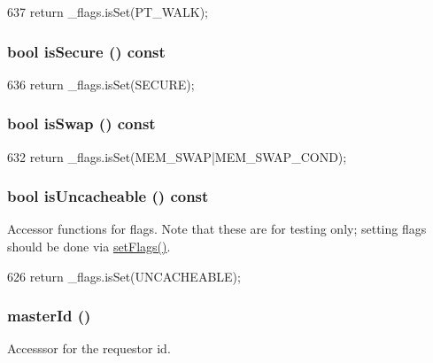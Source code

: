 \begin{DoxyCode}
637 { return _flags.isSet(PT_WALK); }
\end{DoxyCode}
\hypertarget{classRequest_a3110ebf17828782ae5aeced7396cfff2}{
\subsubsection[{isSecure}]{\setlength{\rightskip}{0pt plus 5cm}bool isSecure () const}}
\label{classRequest_a3110ebf17828782ae5aeced7396cfff2}



\begin{DoxyCode}
636 { return _flags.isSet(SECURE); }
\end{DoxyCode}
\hypertarget{classRequest_a6ec455c5a36403d3a8319bcfbf356bc1}{
\subsubsection[{isSwap}]{\setlength{\rightskip}{0pt plus 5cm}bool isSwap () const}}
\label{classRequest_a6ec455c5a36403d3a8319bcfbf356bc1}



\begin{DoxyCode}
632 { return _flags.isSet(MEM_SWAP|MEM_SWAP_COND); }
\end{DoxyCode}
\hypertarget{classRequest_a70c74b2809417ea8701dd6ba9e34312d}{
\subsubsection[{isUncacheable}]{\setlength{\rightskip}{0pt plus 5cm}bool isUncacheable () const}}
\label{classRequest_a70c74b2809417ea8701dd6ba9e34312d}
Accessor functions for flags. Note that these are for testing only; setting flags should be done via \hyperlink{classRequest_a33971d22712c9c80177e4362dffd5580}{setFlags()}. 


\begin{DoxyCode}
626 { return _flags.isSet(UNCACHEABLE); }
\end{DoxyCode}
\hypertarget{classRequest_a9b7d32db0521388c0953e531c79aab50}{
\subsubsection[{masterId}]{ masterId ()}}
\label{classRequest_a9b7d32db0521388c0953e531c79aab50}
Accesssor for the requestor id. 


